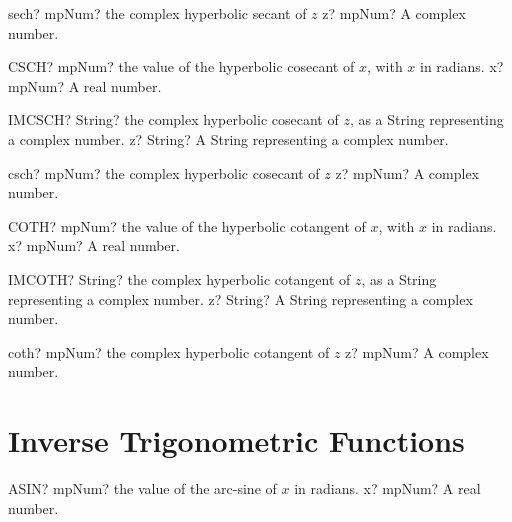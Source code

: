 \documentclass[12pt,a4paper,openany]{book}
\begin{document}
\begin{mpFunctionsExtract}
\mpFunctionOne
{sech? mpNum? the complex hyperbolic secant of $z$}
{z? mpNum? A complex number.}
\end{mpFunctionsExtract}

\begin{mpFunctionsExtract}
\mpWorksheetFunctionOneNotImplemented
{CSCH? mpNum? the value of the hyperbolic cosecant of $x$, with $x$ in radians.}
{x? mpNum? A real number.}
\end{mpFunctionsExtract}

\begin{mpFunctionsExtract}
\mpWorksheetFunctionOneNotImplemented
{IMCSCH? String? the complex hyperbolic cosecant of $z$, as a String representing a complex number.}
{z? String? A String representing a complex number.}
\end{mpFunctionsExtract}

\begin{mpFunctionsExtract}
\mpFunctionOne
{csch? mpNum? the complex hyperbolic cosecant of $z$}
{z? mpNum? A complex number.}
\end{mpFunctionsExtract}

\begin{mpFunctionsExtract}
\mpWorksheetFunctionOneNotImplemented
{COTH? mpNum? the value of the hyperbolic cotangent of $x$, with $x$ in radians.}
{x? mpNum? A real number.}
\end{mpFunctionsExtract}

\begin{mpFunctionsExtract}
\mpWorksheetFunctionOneNotImplemented
{IMCOTH? String? the complex hyperbolic cotangent of $z$, as a String representing a complex number.}
{z? String? A String representing a complex number.}
\end{mpFunctionsExtract}

\begin{mpFunctionsExtract}
\mpFunctionOne
{coth? mpNum? the complex hyperbolic cotangent of $z$}
{z? mpNum? A complex number.}
\end{mpFunctionsExtract}

\section{Inverse Trigonometric Functions}

\begin{mpFunctionsExtract}
\mpWorksheetFunctionOneNotImplemented
{ASIN? mpNum? the value of the arc-sine of $x$ in radians.}
{x? mpNum? A real number.}
\end{mpFunctionsExtract}
\end{document}
